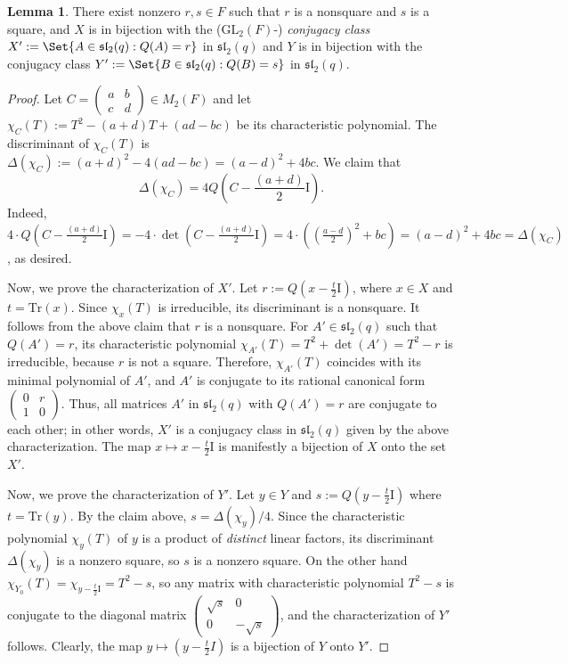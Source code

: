 \documentclass[preprint,11pt]{amsart}
\theoremstyle{definition}
\numberwithin{thm}{section}
\newtheorem{lem}[thm]{Lemma}
\def\sl{\mathfrak{sl}}
\newcommand{\tit}[1]{\textit{#1}}
\newcommand{\tr}{\textrm{Tr}}
\newcommand{\GL}{\textrm{GL}}
\newcommand{\id}{\mathrm{I}}
\begin{document}
\begin{lem}\label{characterization_X_Y}
There exist nonzero $r,s \in F$ such that $r$ is a nonsquare and $s$ is a square, and $X$ is in bijection with the ($\GL_2(F)$-) \tit{conjugacy class} $X' := \Set{ A \in \sl_2(q) : Q(A) = r } $ in $\sl_2(q)$ and $Y$ is in bijection with the conjugacy class $Y' := \Set{ B \in \sl_2(q) : Q(B) = s}$ in $\sl_2(q)$.

\end{lem}
\begin{proof}
Let $C = \begin{pmatrix} a & b \\ c & d \end{pmatrix} \in M_2(F)$ and let $
\chi_C(T) := T^2 - (a+d) T + (ad-bc)$ be its characteristic polynomial. The discriminant of $\chi_C(T)$ is $\Delta(\chi_C) := (a+d)^2 - 4 (ad-bc) = (a-d)^2 + 4bc$.  We claim that
$$
\Delta(\chi_C) = 4 Q \left(C- \frac{(a+d)}{2} \id \right).
$$
Indeed,
$4 \cdot Q \left(C - \frac{(a+d)}{2} \id \right)= - 4 \cdot \det\left( C - \frac{(a+d)}{2} \id \right) = 4 \cdot \left( \left( \frac{a-d}{2} \right)^2 + bc \right) = (a-d)^2 + 4bc= \Delta(\chi_C)$,  as desired.

Now, we prove the characterization of $X'$. Let $r := Q(x- \frac{t}{2} \id)$, where $x \in X$ and $t = \tr(x)$. Since $\chi_x(T)$ is irreducible, its discriminant is a nonsquare. It follows from the above claim that $r$ is a nonsquare. For $A' \in \sl_2(q)$ such that $Q(A') = r$, its characteristic polynomial  $\chi_{A'}(T) = T^2 + \det(A') = T^2  - r$ is irreducible, because $r$ is not a square. Therefore, $\chi_{A'}(T)$ coincides with its minimal polynomial of $A'$, and $A'$ is conjugate to its rational canonical form $\begin{pmatrix} 0 & r \\ 1  & 0 \end{pmatrix}$. Thus, all matrices $A'$ in $\sl_2(q)$ with $Q(A') = r$ are conjugate to each other; in other words, $X'$ is a conjugacy class in $\sl_2(q)$ given by the above characterization. The map $x \mapsto  x- \frac{t}{2} \id$ is manifestly a  bijection of $X$ onto the set $X'$.


Now, we prove the characterization of $Y'$. Let $y \in Y$ and $s := Q(y- \frac{t}{2} \id)$ where $t = \tr(y)$. By the claim above, $s = \Delta(\chi_y)/4$. Since the  characteristic polynomial $\chi_y(T)$ of $y$ is a product of \tit{distinct} linear factors, its discriminant $\Delta(\chi_y)$ is a nonzero square, so $s$ is a nonzero square. On the other hand $\chi_{Y_0}(T) = \chi_{y - \frac{t}{2} \id}= T^2 - s$, so any matrix with characteristic polynomial $T^2 -s$ is conjugate to the diagonal matrix $\begin{pmatrix} \sqrt{s} & 0 \\ 0 & -\sqrt{s} \end{pmatrix}$, and the characterization of $Y'$ follows. Clearly, the map $y \mapsto \left(y- \frac{t}{2}I \right)$ is a bijection of $Y$ onto $Y'$.
\end{proof}
\end{document}

